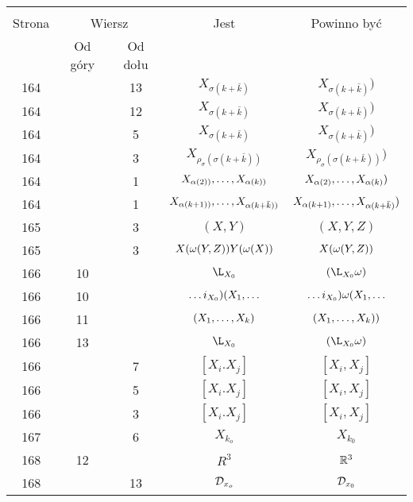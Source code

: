 \documentclass[a4paper,11pt]{article}
\begin{document}
\begin{center}
  \begin{tabular}{|c|c|c|c|c|}
    \hline
    & \multicolumn{2}{c|}{} & & \\
    Strona & \multicolumn{2}{c|}{Wiersz} & Jest
                              & Powinno być \\ \cline{2-3}
    & Od góry & Od dołu & & \\
    \hline
    164 & & 13 & $X_{ \sigma( k + \bar{ k } ) }$ & $X_{ \sigma( k + \bar{ k } ) } )$ \\
    164 & & 12 & $X_{ \sigma( k + \bar{ k } ) }$ & $X_{ \sigma( k + \bar{ k } ) } )$ \\
    164 & &  5 & $X_{ \sigma( k + \bar{ k } ) }$ & $X_{ \sigma( k + \bar{ k } ) } )$ \\
    164 & &  3 & $X_{ \rho_{ \sigma }( \sigma( k + \bar{ k } ) ) }$
           & $X_{ \rho_{ \sigma }( \sigma( k + \bar{ k } ) ) } )$ \\
    164 & &  1 & $X_{ \alpha( 2 ) ) }, \ldots, X_{ \alpha( k ) ) }$
           & $X_{ \alpha( 2 ) }, \ldots, X_{ \alpha( k ) } )$ \\
    164 & &  1 & $X_{ \alpha( k + 1 ) ) }, \ldots, X_{ \alpha( k + \bar{ k } ) ) }$
           & $X_{ \alpha( k + 1 ) }, \ldots, X_{ \alpha( k + \bar{ k } ) } )$ \\
    165 & &  3 & $( X, Y )$ & $( X, Y, Z )$ \\
    165 & &  3 & $X( \omega( Y, Z ) ) Y( \omega( X ) )$
           & $X( \omega( Y, Z ) )$ \\
    166 & 10 & & $\L_{ { X_{ 0 } } }$ & $( \L_{ { X_{ 0 } } } \om )$ \\
    166 & 10 & & $\ldots i_{ { X_{ 0 } } } ) ( X_{ 1 }, \ldots$
           & $\ldots i_{ { X_{ 0 } } } ) \omega( X_{ 1 }, \ldots$ \\
    166 & 11 & & $( X_{ 1 }, \ldots, X_{ k } )$ & $( X_{ 1 }, \ldots,
                                               X_{ k } ))$ \\
    166 & 13 & & $\L_{ { X_{ 0 } } }$ & $( \L_{ { X_{ 0 } } } \om )$ \\
    166 & &  7 & $[ X_{ i }. X_{ j } ]$ & $[ X_{ i }, X_{ j } ]$ \\
    166 & &  5 & $[ X_{ i }. X_{ j } ]$ & $[ X_{ i }, X_{ j } ]$ \\
    166 & &  3 & $[ X_{ i }. X_{ j } ]$ & $[ X_{ i }, X_{ j } ]$ \\
    167 & &  6 & $X_{ k_{ o } }$ & $X_{ k_{ 0 } }$ \\
    168 & 12 & & $R^{ 3 }$ & $\mathbb{R}^{ 3 }$ \\
    168 & & 13 & $\mathcal{D}_{ x_{ o } }$ & $\mathcal{D}_{ x_{ 0 } }$ \\

\end{tabular}
\end{center}
\end{document}
